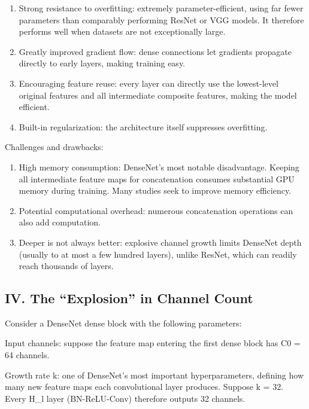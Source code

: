 \begin{enumerate}
\def\labelenumi{\arabic{enumi}.}
\item
  Strong resistance to overfitting: extremely parameter-efficient, using far fewer parameters than comparably performing ResNet or VGG models. It therefore performs well when datasets are not exceptionally large.
\item
  Greatly improved gradient flow: dense connections let gradients propagate directly to early layers, making training easy.
\item
  Encouraging feature reuse: every layer can directly use the lowest-level original features and all intermediate composite features, making the model efficient.
\item
  Built-in regularization: the architecture itself suppresses overfitting.
\end{enumerate}

Challenges and drawbacks:

\begin{enumerate}
\def\labelenumi{\arabic{enumi}.}
\item
  High memory consumption: DenseNet's most notable disadvantage. Keeping all intermediate feature maps for concatenation consumes substantial GPU memory during training. Many studies seek to improve memory efficiency.
\item
  Potential computational overhead: numerous concatenation operations can also add computation.
\item
  Deeper is not always better: explosive channel growth limits DenseNet depth (usually to at most a few hundred layers), unlike ResNet, which can readily reach thousands of layers.
\end{enumerate}

\hypertarget{iv.-the-explosion-in-channel-count}{%
\subsection{IV. The ``Explosion'' in Channel Count}\label{iv.-the-explosion-in-channel-count}}

Consider a DenseNet dense block with the following parameters:

Input channels: suppose the feature map entering the first dense block has C0 = 64 channels.

Growth rate k: one of DenseNet's most important hyperparameters, defining how many new feature maps each convolutional layer produces. Suppose k = 32. Every H\_l layer (BN-ReLU-Conv) therefore outputs 32 channels.

